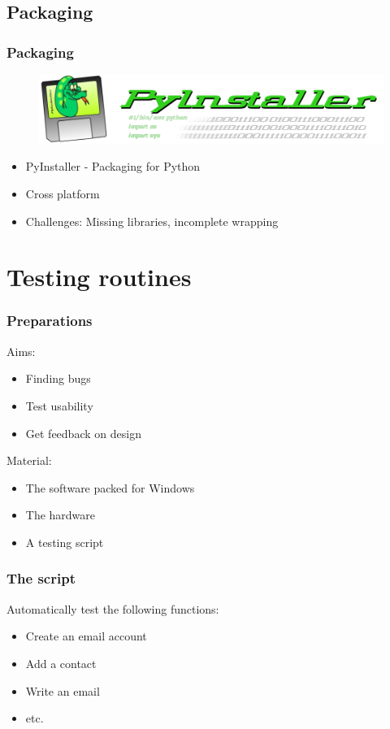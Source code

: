\documentclass[9pt]{beamer}
\begin{document}
		\subsection{Packaging}
			\begin{frame}
				\frametitle{Packaging}
				\begin{figure}
					\includegraphics[scale=1]{Images/pyinstaller_logo.png}
				\end{figure}
				\begin{itemize}
					\item PyInstaller - Packaging for Python
					\item Cross platform
					\item Challenges: Missing libraries, incomplete wrapping
				\end{itemize}
			\end{frame}
			
	\section{Testing routines}
		
		\begin{frame}
			\frametitle{Preparations}
			Aims:
			\begin{itemize}
				\item Finding bugs
				\item Test usability
				\item Get feedback on design
			\end{itemize}
			Material:
			\begin{itemize}
				\item The software packed for Windows
				\item The hardware
				\item A testing script
			\end{itemize}
		\end{frame}
		
		\begin{frame}
			\frametitle{The script}
			Automatically test the following functions:
			\begin{itemize}
				\item Create an email account
				\item Add a contact
				\item Write an email
				\item etc.
			\end{itemize}
		\end{frame}
		
\end{document}
